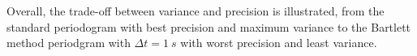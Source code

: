 \begin{enumerate}[label=\alph*), leftmargin=*]
Overall, the trade-off between variance and precision is illustrated, from the standard periodogram with best precision and maximum variance to the Bartlett method periodgram
with $\Delta t = 1\ s$ with worst precision and least variance.

%
\end{enumerate}